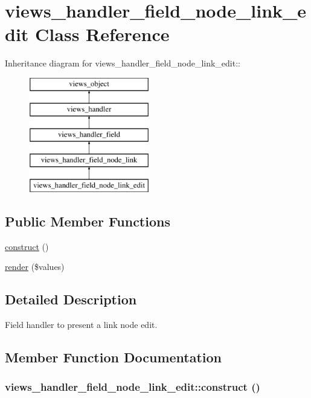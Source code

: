 \hypertarget{classviews__handler__field__node__link__edit}{
\section{views\_\-handler\_\-field\_\-node\_\-link\_\-edit Class Reference}
\label{classviews__handler__field__node__link__edit}
}
Inheritance diagram for views\_\-handler\_\-field\_\-node\_\-link\_\-edit::\begin{figure}[H]
\begin{center}
\leavevmode
\includegraphics[height=5cm]{classviews__handler__field__node__link__edit}
\end{center}
\end{figure}
\subsection*{Public Member Functions}
\begin{CompactItemize}
\item 
\hyperlink{classviews__handler__field__node__link__edit_8b0caf63f855b91c68b7dd000e2bef9e}{construct} ()
\item 
\hyperlink{classviews__handler__field__node__link__edit_86877ed929d2fcb0b8204c0907cf5b5c}{render} (\$values)
\end{CompactItemize}


\subsection{Detailed Description}
Field handler to present a link node edit. 

\subsection{Member Function Documentation}
\hypertarget{classviews__handler__field__node__link__edit_8b0caf63f855b91c68b7dd000e2bef9e}{
\subsubsection[{construct}]{\setlength{\rightskip}{0pt plus 5cm}views\_\-handler\_\-field\_\-node\_\-link\_\-edit::construct ()}}
\label{classviews__handler__field__node__link__edit_8b0caf63f855b91c68b7dd000e2bef9e}


